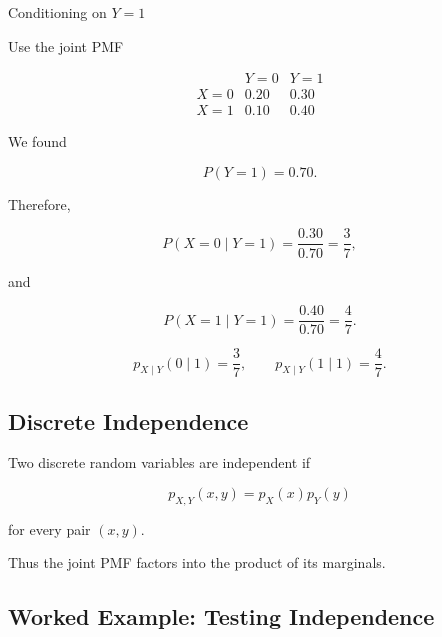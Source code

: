 \begin{workedexamplebox}{Conditioning on \(Y=1\)}

Use the joint PMF

\[
\begin{array}{c|cc}
 & Y=0 & Y=1\\
\hline
X=0 & 0.20 & 0.30\\
X=1 & 0.10 & 0.40
\end{array}
\]

We found

\[
P(Y=1)=0.70.
\]

Therefore,

\[
P(X=0\mid Y=1)
=
\frac{0.30}{0.70}
=
\frac37,
\]

and

\[
P(X=1\mid Y=1)
=
\frac{0.40}{0.70}
=
\frac47.
\]

\begin{answerbox}
\[
\boxed{
p_{X\mid Y}(0\mid1)=\frac37,
\qquad
p_{X\mid Y}(1\mid1)=\frac47.
}
\]
\end{answerbox}

\end{workedexamplebox}

\subsection{Discrete Independence}
\label{subsec:discrete-joint-independence}

Two discrete random variables are independent if

\[
\boxed{
p_{X,Y}(x,y)
=
p_X(x)p_Y(y)
}
\]

for every pair \((x,y)\).

Thus the joint PMF factors into the product of its marginals.

\subsection{Worked Example: Testing Independence}
\label{subsec:worked-discrete-independence}


